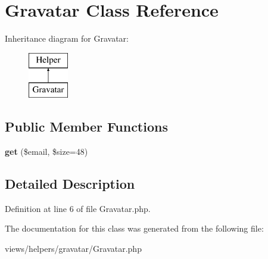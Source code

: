\hypertarget{class_gravatar}{
\section{Gravatar Class Reference}
\label{class_gravatar}
}
Inheritance diagram for Gravatar:\begin{figure}[H]
\begin{center}
\leavevmode
\includegraphics[height=2.000000cm]{class_gravatar}
\end{center}
\end{figure}
\subsection*{Public Member Functions}
\begin{DoxyCompactItemize}
\item 
\hypertarget{class_gravatar_aa2e26b9572610385947fae1e4c822c94}{
{\bfseries get} (\$email, \$size=48)}
\label{class_gravatar_aa2e26b9572610385947fae1e4c822c94}

\end{DoxyCompactItemize}


\subsection{Detailed Description}


Definition at line 6 of file Gravatar.php.



The documentation for this class was generated from the following file:\begin{DoxyCompactItemize}
\item 
views/helpers/gravatar/Gravatar.php\end{DoxyCompactItemize}
